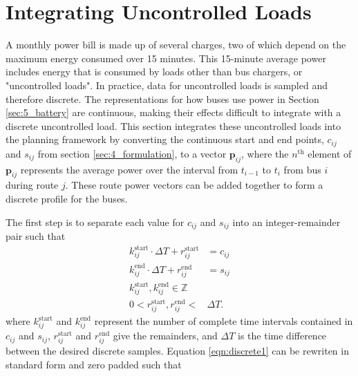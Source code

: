\section{Integrating Uncontrolled Loads\label{sec:uncontrolled}}
A monthly power bill is made up of several charges, two of which depend on the maximum energy consumed over 15 minutes. This 15-minute average power includes energy that is consumed by loads other than bus chargers, or "uncontrolled loads". In practice, data for uncontrolled loads is sampled and therefore discrete. The representations for how buses use power in Section \ref{sec:5_battery} are continuous, making their effects difficult to integrate with a discrete uncontrolled load. This section integrates these uncontrolled loads into the planning framework by converting the continuous start and end points, $c_{ij}$ and $s_{ij}$ from section \ref{sec:4_formulation}, to a vector $\mathbf{p}_{ij}$, where the $n^{\text{th}}$ element of $\mathbf{p}_{ij}$ represents the average power over the interval from $t_{i-1}$ to $t_i$ from bus $i$ during route $j$. These route power vectors can be added together to form a discrete profile for the buses.
\par The first step is to separate each value for $c_{ij}$ and $s_{ij}$ into an integer-remainder pair such that
\begin{equation} \label{eqn:discrete1} \begin{aligned}
		k^{\text{start}}_{ij}\cdot\Delta T + r^{\text{start}}_{ij}&= c_{ij} \\
		k^{\text{end}}_{ij}\cdot\Delta T + r^{\text{end}}_{ij}&= s_{ij} \\
	k^{\text{start}}_{ij}, k^{\text{end}}_{ij} \in \mathbb{Z} \\
	0 < r^{\text{start}}_{ij}, r^{\text{end}}_{ij} < &\Delta T.
\end{aligned} \end{equation} 
where $k_{ij}^{\text{start}}$ and $k_{ij}^{\text{end}}$ represent the number of complete time intervals contained in $c_{ij}$ and $s_{ij}$, $r_{ij}^{\text{start}}$ and $r_{ij}^{\text{end}}$ give the remainders, and $\Delta T$ is the time difference between the desired discrete samples. Equation \ref{eqn:discrete1} can be rewriten in standard form and zero padded such that
